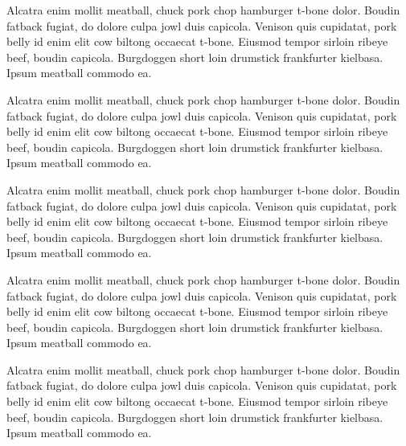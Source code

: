 \documentclass{article}
\begin{document}
 Alcatra enim mollit meatball, chuck pork chop hamburger t-bone dolor. Boudin fatback fugiat, do dolore culpa jowl duis capicola. Venison quis cupidatat, pork belly id enim elit cow biltong occaecat t-bone. Eiusmod tempor sirloin ribeye beef, boudin capicola. Burgdoggen short loin drumstick frankfurter kielbasa. Ipsum meatball commodo ea.
 
 
 Alcatra enim mollit meatball, chuck pork chop hamburger t-bone dolor. Boudin fatback fugiat, do dolore culpa jowl duis capicola. Venison quis cupidatat, pork belly id enim elit cow biltong occaecat t-bone. Eiusmod tempor sirloin ribeye beef, boudin capicola. Burgdoggen short loin drumstick frankfurter kielbasa. Ipsum meatball commodo ea.

 
 Alcatra enim mollit meatball, chuck pork chop hamburger t-bone dolor. Boudin fatback fugiat, do dolore culpa jowl duis capicola. Venison quis cupidatat, pork belly id enim elit cow biltong occaecat t-bone. Eiusmod tempor sirloin ribeye beef, boudin capicola. Burgdoggen short loin drumstick frankfurter kielbasa. Ipsum meatball commodo ea.
 
 
 Alcatra enim mollit meatball, chuck pork chop hamburger t-bone dolor. Boudin fatback fugiat, do dolore culpa jowl duis capicola. Venison quis cupidatat, pork belly id enim elit cow biltong occaecat t-bone. Eiusmod tempor sirloin ribeye beef, boudin capicola. Burgdoggen short loin drumstick frankfurter kielbasa. Ipsum meatball commodo ea.
 
 
 Alcatra enim mollit meatball, chuck pork chop hamburger t-bone dolor. Boudin fatback fugiat, do dolore culpa jowl duis capicola. Venison quis cupidatat, pork belly id enim elit cow biltong occaecat t-bone. Eiusmod tempor sirloin ribeye beef, boudin capicola. Burgdoggen short loin drumstick frankfurter kielbasa. Ipsum meatball commodo ea.
 
 
\end{document}
